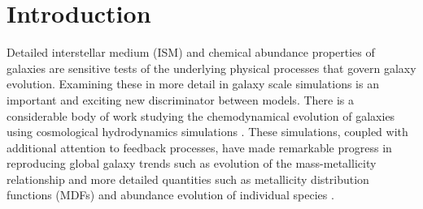 \documentclass[twocolumn]{aastex61}
\begin{document}

\section{Introduction}
%
%
%

Detailed interstellar medium (ISM) and chemical abundance properties of galaxies
are sensitive tests of the underlying physical processes that govern galaxy evolution. Examining these in more detail in galaxy scale simulations is an important and exciting new discriminator between models. There is a considerable body of work studying the chemodynamical evolution of galaxies using cosmological hydrodynamics simulations \citep[e.g.][]{Lia2002,KawataGibson2003,Kobayashi2004,Tornatore2004,Romeo2005,OppenheimerDave2008,Wiersma2009,Shen2010,MUGS2010,ErisSimulation,Brook2014,Snaith2015,Oppenheimer2016,OWLS,EAGLE,FIRE}. These simulations, coupled with additional attention to feedback processes, have made remarkable progress in reproducing global galaxy trends such as evolution of the mass-metallicity relationship \citep[e.g.][]{Obreja2014, Ma2016, Dave2017, Torrey2017} and more detailed quantities such as metallicity distribution functions (MDFs) and abundance evolution of individual species \citep{Marcolini2008,Revaz2009,Sawala2010,RevazJablonka2012,Jeon2017,Hirai2017} . 
\end{document}
